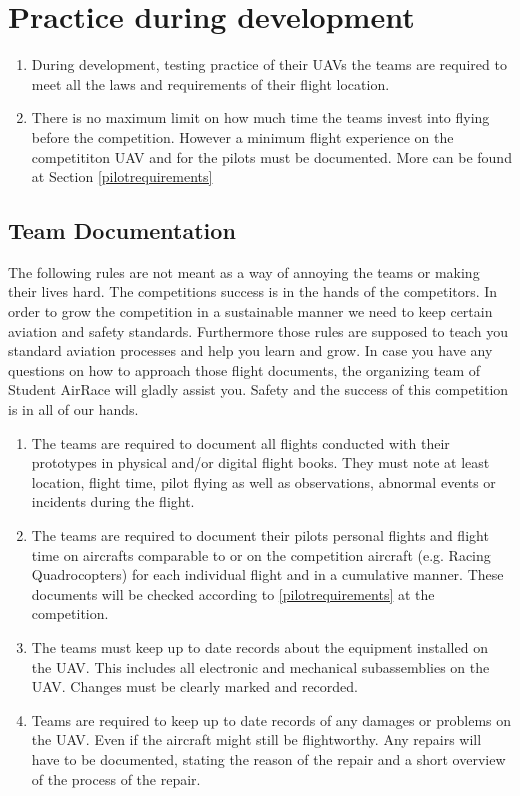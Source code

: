     \section{Practice during development}
    \begin{enumerate}
      \item During development, testing practice of their UAVs the teams are required to meet all the laws and requirements of their flight location. 
      \item There is no maximum limit on how much time the teams invest into flying before the competition. However a minimum flight experience on the competititon UAV and for the pilots must be documented. More can be found at Section \ref{pilotrequirements}
    \end{enumerate}

    \subsection{Team Documentation}
    The following rules are not meant as a way of annoying the teams or making their lives hard. The competitions success is in the hands of the competitors. In order to grow the competition 
    in a sustainable manner we need to keep certain aviation and safety standards. Furthermore those rules are supposed to teach you standard aviation processes and help you learn and grow. 
    In case you have any questions on how to approach those flight documents, the organizing team of Student AirRace will gladly assist you. Safety and the success of this competition is in all of our hands.
    \begin{enumerate}
      \item The teams are required to document all flights conducted with their prototypes in physical and/or digital flight books. They must note at least location, flight time, pilot flying 
      as well as observations, abnormal events or incidents during the flight.
      \item The teams are required to document their pilots personal flights and flight time on aircrafts comparable to or on the competition aircraft (e.g. Racing Quadrocopters)
      for each individual flight and in a cumulative manner. These documents will be checked according to \ref{pilotrequirements} at the competition. 
      \item The teams must keep up to date records about the equipment installed on the UAV. This includes all electronic and mechanical subassemblies on the UAV. 
      Changes must be clearly marked and recorded. 
      \item Teams are required to keep up to date records of any damages or problems on the UAV. Even if the aircraft might still be flightworthy. 
      Any repairs will have to be documented, stating the reason of the repair and a short overview of the process of the repair. 
    \end{enumerate}

